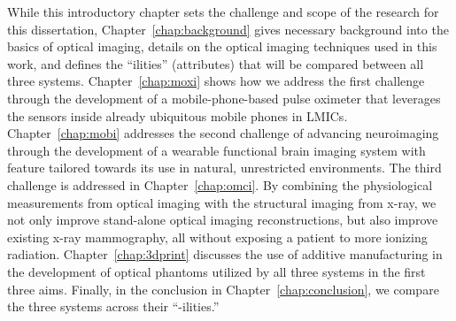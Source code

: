 While this introductory chapter sets the challenge and scope of the research for this dissertation, Chapter~\ref{chap:background} gives necessary background into the basics of optical imaging, details on the optical imaging techniques used in this work, and defines the ``ilities'' (attributes) that will be compared between all three systems. Chapter~\ref{chap:moxi} shows how we address the first challenge through the development of a mobile-phone-based pulse oximeter that leverages the sensors inside already ubiquitous mobile phones in LMICs. Chapter~\ref{chap:mobi} addresses the second challenge of advancing neuroimaging through the development of a wearable functional brain imaging system with feature tailored towards its use in natural, unrestricted environments. The third challenge is addressed in Chapter~\ref{chap:omci}. By combining the physiological measurements from optical imaging with the structural imaging from x-ray, we not only improve stand-alone optical imaging reconstructions, but also improve existing x-ray mammography, all without exposing a patient to more ionizing radiation. Chapter~\ref{chap:3dprint} discusses the use of additive manufacturing in the development of optical phantoms utilized by all three systems in the first three aims. Finally, in the conclusion in Chapter~\ref{chap:conclusion}, we compare the three systems across their ``-ilities.''


